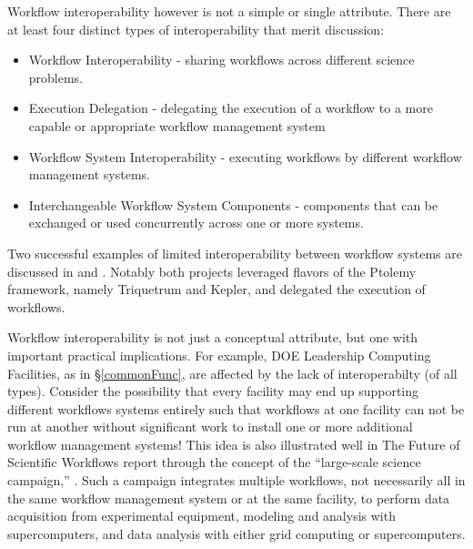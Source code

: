 Workflow interoperability however is not a simple or single attribute. There
are at least four distinct types of interoperability that merit discussion:
\begin{itemize} \item Workflow Interoperability - sharing workflows across
different science problems.  \item Execution Delegation - delegating the
execution of a workflow to a more capable or appropriate workflow management
system \item Workflow System Interoperability - executing workflows by
different workflow management systems.  \item Interchangeable Workflow System
Components - components that can be exchanged or used concurrently across one
or more systems.  \end{itemize} Two successful examples of limited
interoperability between workflow systems are discussed in
\cite{brooks_triquetrum:_2015} and \cite{mandal_integrating_2007}. Notably
both projects leveraged flavors of the Ptolemy framework, namely Triquetrum
and Kepler, and delegated the execution of workflows.

Workflow interoperability is not just a conceptual attribute, but one with
important practical implications. For example, DOE Leadership Computing
Facilities, as in \S\ref{commonFunc}, are affected by the lack of
interoperabilty (of all types). Consider the possibility that every facility
may end up supporting different workflows systems entirely such that workflows
at one facility can not be run at another without significant work to install
one or more additional workflow management systems! This idea is also
illustrated well in The Future of Scientific Workflows report through the
concept of the ``large-scale science campaign,'' \cite{deelman_future_2015}.
Such a campaign integrates multiple workflows, not necessarily all in the same
workflow management system or at the same facility, to perform data
acquisition from experimental equipment, modeling and analysis with
supercomputers, and data analysis with either grid computing or
supercomputers.


